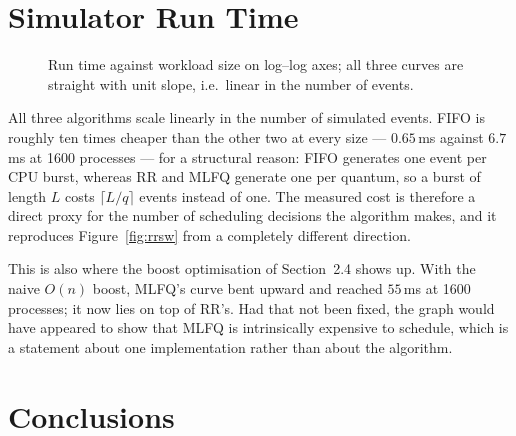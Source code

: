 \documentclass[11pt,a4paper]{article}
\begin{document}
\section{Simulator Run Time}

\begin{figure}[h]
\centering
{}
\caption{Run time against workload size on log--log axes; all three curves are
straight with unit slope, i.e.\ linear in the number of events.}
\label{fig:scale}
\end{figure}

All three algorithms scale linearly in the number of simulated events. FIFO is
roughly ten times cheaper than the other two at every size --- $0.65$\,ms
against $6.7$\,ms at 1600 processes --- for a structural reason: FIFO generates
one event per CPU burst, whereas RR and MLFQ generate one per quantum, so a
burst of length $L$ costs $\lceil L/q \rceil$ events instead of one. The
measured cost is therefore a direct proxy for the number of scheduling
decisions the algorithm makes, and it reproduces Figure~\ref{fig:rrsw} from a
completely different direction.

This is also where the boost optimisation of Section~2.4 shows up. With the
naive $O(n)$ boost, MLFQ's curve bent upward and reached $55$\,ms at 1600
processes; it now lies on top of RR's. Had that not been fixed, the graph would
have appeared to show that MLFQ is intrinsically expensive to schedule, which
is a statement about one implementation rather than about the algorithm.

\section{Conclusions}
\end{document}
